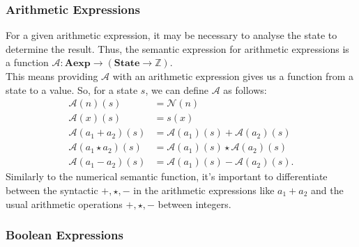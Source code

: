 \documentclass[a4paper, 12pt, twoside]{article}
\begin{document}
\subsubsection{Arithmetic Expressions}

For a given arithmetic expression, it may be necessary to analyse the state
to determine the result. Thus, the semantic expression for arithmetic
expressions is a function $\mathcal{A} : \textbf{Aexp} \to (\textbf{State} 
\to \mathbb{Z})$. 
\\[\baselineskip]
This means providing $\mathcal{A}$ with an arithmetic
expression gives us a function from a state to a value. So, for a state $s$,
we can define $\mathcal{A}$ as follows: \begin{align*}
  \mathcal{A}(n)(s) &= \mathcal{N}(n) \\
  \mathcal{A}(x)(s) &= s(x) \\
  \mathcal{A}(a_1 + a_2)(s) &= \mathcal{A}(a_1)(s) + \mathcal{A}(a_2)(s) \\
  \mathcal{A}(a_1 \star a_2)(s) &= \mathcal{A}(a_1)(s) \star \mathcal{A}(a_2)(s) \\
  \mathcal{A}(a_1 - a_2)(s) &= \mathcal{A}(a_1)(s) - \mathcal{A}(a_2)(s).
\end{align*} Similarly to the numerical semantic function, it's important
to differentiate between the syntactic $+, \star, -$ in the arithmetic
expressions like $a_1 + a_2$ and the usual arithmetic operations $+, \star, -$
between integers.

\subsubsection{Boolean Expressions}
\end{document}
